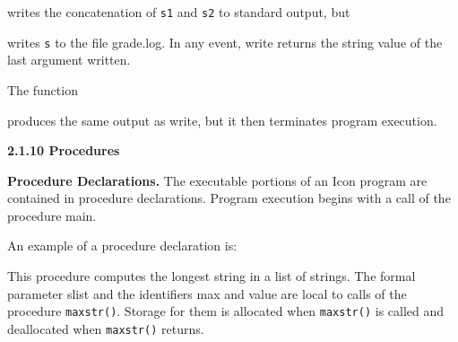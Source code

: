 

\noindent
writes the concatenation of \texttt{s1} and \texttt{s2} to standard output, but



\noindent
writes \texttt{s} to the file grade.log. In any event, write returns
the string value of the last argument written.

The function



\noindent
produces the same output as write, but it then terminates program execution.

{\sffamily\bfseries
2.1.10 Procedures}

\textbf{Procedure Declarations.} The executable portions of an Icon
program are contained in procedure declarations.  Program execution
begins with a call of the procedure main.

An example of a procedure declaration is:




This procedure computes the longest string in a list of strings. The
formal parameter slist and the identifiers max and value are local to
calls of the procedure \texttt{maxstr()}. Storage for them is
allocated when \texttt{maxstr()} is called and deallocated when
\texttt{maxstr()} returns.

